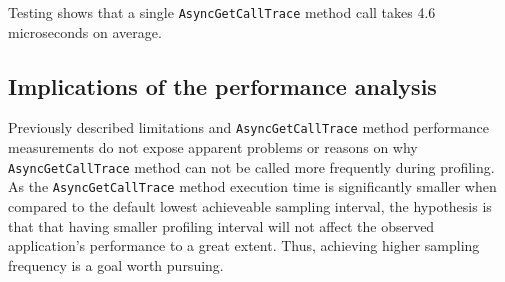 \documentclass[..thesis.tex]{subfiles}
\begin{document}
Testing shows that a single \texttt{AsyncGetCallTrace} method call takes 4.6 microseconds on average.

\subsection{Implications of the performance analysis}
Previously described limitations and \texttt{Async\-Get\-Call\-Trace} method performance measurements do not expose apparent problems or reasons on why \texttt{Async\-Get\-Call\-Trace} method can not be called more frequently during profiling. As the \texttt{Async\-Get\-Call\-Trace} method execution time is significantly smaller when compared to the default lowest achieveable sampling interval, the hypothesis is that that having smaller profiling interval will not affect the observed application's performance to a great extent. Thus, achieving higher sampling frequency is a goal worth pursuing.
\end{document}
